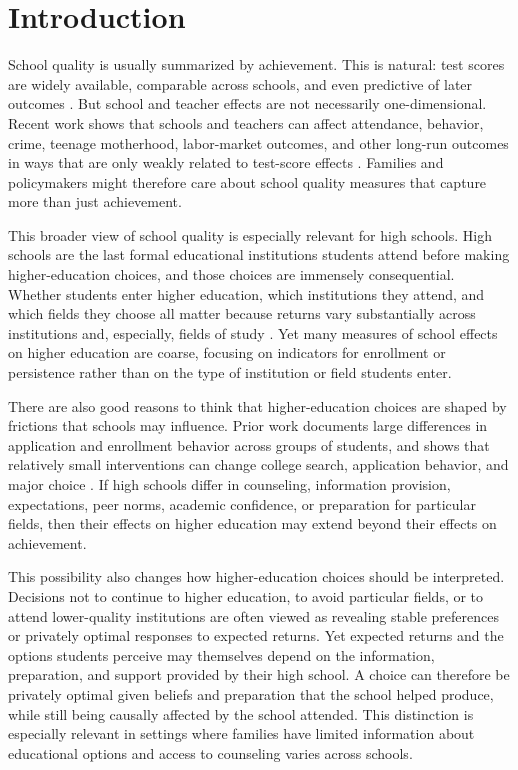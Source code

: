 \documentclass[a4paper, article, english, oneside, unknownkeysallowed, 12pt]{memoir}
\begin{document}
\clearpage
\section{Introduction}

School quality is usually summarized by achievement.
This is natural: test scores are widely available, comparable across schools, and even predictive of later outcomes \parencite{chetty_how_2011}.
But school and teacher effects are not necessarily one-dimensional.
Recent work shows that schools and teachers can affect attendance, behavior, crime, teenage motherhood, labor-market outcomes, and other long-run outcomes in ways that are only weakly related to test-score effects \parencite{jackson_what_2018, beuermann_what_2023, rose_effects_2022, angrist_methods_2023}.
Families and policymakers might therefore care about school quality measures that capture more than just achievement.

This broader view of school quality is especially relevant for high schools.
High schools are the last formal educational institutions students attend before making higher-education choices, and those choices are immensely consequential.
Whether students enter higher education, which institutions they attend, and which fields they choose all matter because returns vary substantially across institutions and, especially, fields of study \parencite{kirkeboen_field_2016}.
Yet many measures of school effects on higher education are coarse, focusing on indicators for enrollment or persistence rather than on the type of institution or field students enter.

There are also good reasons to think that higher-education choices are shaped by frictions that schools may influence.
Prior work documents large differences in application and enrollment behavior across groups of students, and shows that relatively small interventions can change college search, application behavior, and major choice \parencite{hoxby_what_2015, dynarski_closing_2021, hastings_informed_2016, chetty_diversifying_2025}.
If high schools differ in counseling, information provision, expectations, peer norms, academic confidence, or preparation for particular fields, then their effects on higher education may extend beyond their effects on achievement.

This possibility also changes how higher-education choices should be interpreted.
Decisions not to continue to higher education, to avoid particular fields, or to attend lower-quality institutions are often viewed as revealing stable preferences or privately optimal responses to expected returns.
Yet expected returns and the options students perceive may themselves depend on the information, preparation, and support provided by their high school.
A choice can therefore be privately optimal given beliefs and preparation that the school helped produce, while still being causally affected by the school attended.
This distinction is especially relevant in settings where families have limited information about educational options and access to counseling varies across schools.
\end{document}

